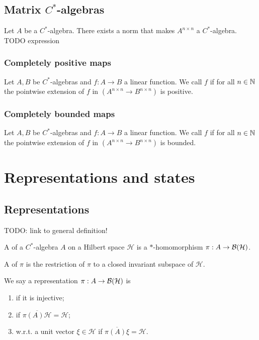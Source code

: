 \section{Matrix $C^*$-algebras}
\begin{lemma}
Let $A$ be a $C^*$-algebra. There exists a norm that makes $A^{n\times n}$ a $C^*$-algebra. TODO expression
\end{lemma}
\subsection{Completely positive maps}
\begin{definition}
Let $A,B$ be $C^*$-algebras and $f:A\to B$ a linear function. We call $f$  if for all $n\in\mathbb{N}$ the pointwise extension of $f$ in $(A^{n\times n}\to B^{n\times n})$ is positive.
\end{definition}

\subsection{Completely bounded maps}
\begin{definition}
Let $A,B$ be $C^*$-algebras and $f:A\to B$ a linear function. We call $f$  if for all $n\in\mathbb{N}$ the pointwise extension of $f$ in $(A^{n\times n}\to B^{n\times n})$ is bounded.
\end{definition}


\chapter{Representations and states}
\section{Representations}
TODO: link to general definition!
\begin{definition}
A  of a $C^*$-algebra $A$ on a Hilbert space $\mathcal{H}$ is a $*$-homomorphism $\pi: A \to \operatorname{\mathcal{B}}(\mathcal{H})$.

A  of $\pi$ is the restriction of $\pi$ to a closed invariant subspace of $\mathcal{H}$.

We say a representation $\pi: A \to \operatorname{\mathcal{B}}(\mathcal{H})$ is
\begin{enumerate}
\item {} if it is injective;
\item {} if $\overline{\pi(A)\mathcal{H}} = \mathcal{H}$;
\item {} w.r.t. a unit vector $\xi\in\mathcal{H}$ if $\overline{\pi(A)\xi} = \mathcal{H}$.
\end{enumerate}
\end{definition}


